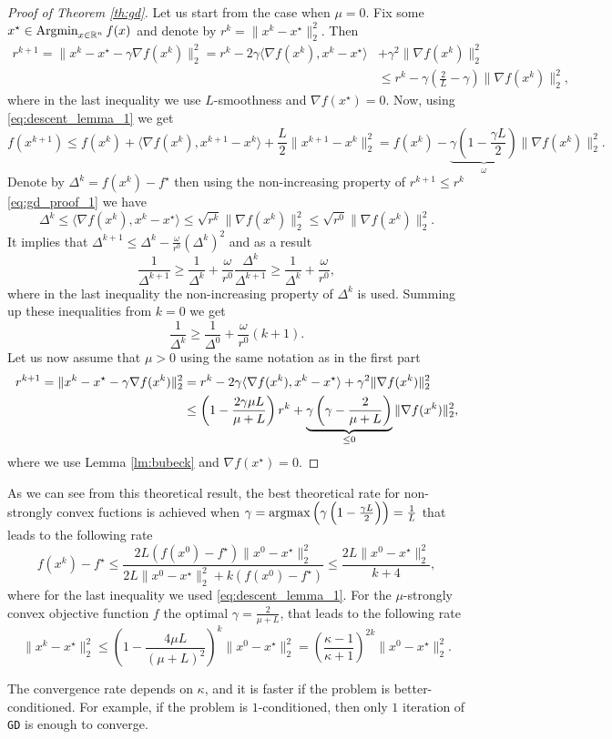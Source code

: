 \begin{proof}[Proof of Theorem \ref{th:gd}]
Let us start from the case when $\mu = 0$. Fix some $x^\star\in\operatorname*{Argmin}_{x\in\mathbb{R}^n} f(x)$ and denote by $r^k = \|x^k-x^\star\|^2_2$.
Then 
\begin{align}\label{eq:gd_proof_1}
r^{k+1} = \|x^k - x^\star - \gamma\nabla f(x^k)\|_2^2 = r^k - 2\gamma\langle \nabla f(x^k), x^k - x^\star\rangle &+ \gamma^2\|\nabla f(x^k)\|_2^2\nonumber\\
&\leq r^k - \gamma\left(\frac2L - \gamma\right)\|\nabla f(x^k)\|_2^2,
\end{align}
where in the last inequality we use $L$-smoothness and $\nabla f(x^\star) = 0$. Now, using \eqref{eq:descent_lemma_1} we get
$$
f(x^{k+1})\leq f(x^k) + \langle \nabla f(x^k), x^{k+1} - x^k\rangle + \frac{L}{2}\|x^{k+1}- x^k\|_2^2 = f(x^k) - \underbrace{\gamma\left(1 - \frac{\gamma L}{2}\right)}_{\omega}\|\nabla f(x^k)\|_2^2.
$$
Denote by $\Delta^k = f(x^k)-f^\star$ then using the non-increasing property of $r^{k+1}\leq r^k$ \eqref{eq:gd_proof_1} we have
$$
\Delta^k \leq\langle\nabla f(x^k), x^k-x^\star\rangle\leq \sqrt{r^k}\|\nabla f(x^k)\|_2^2\leq \sqrt{r^0}\|\nabla f(x^k)\|_2^2.
$$
It implies that $\Delta^{k+1}\leq\Delta^k - \frac{\omega}{r^0}(\Delta^k)^2$ and as a result
$$
\frac{1}{\Delta^{k+1}}\geq \frac{1}{\Delta^k} + \frac{\omega}{r^0}\frac{\Delta^k}{\Delta^{k+1}}\geq \frac{1}{\Delta^k} + \frac{\omega}{r^0},
$$
where in the last inequality the non-increasing property of $\Delta^k$ is used.
Summing up these inequalities from $k=0$ we get
$$
\frac{1}{\Delta^k}\geq \frac{1}{\Delta^0} + \frac{\omega}{r^0}(k+1).
$$
Let us now assume that $\mu> 0$ using the same notation as in the first part
\begin{align}
r^{k+1} = \|x^k - x^\star - \gamma \nabla f(x^k)\|_2^2 &= r^k - 2\gamma\langle \nabla f(x^k), x^k - x^\star\rangle + \gamma^2\|\nabla f(x^k)\|_2^2\nonumber\\
&\leq \left(1-\frac{2\gamma\mu L}{\mu + L}\right) {r^k}+ \underbrace{\gamma\left(\gamma - \frac{2}{\mu + L}\right)}_{\leq 0}\|\nabla f(x^k)\|_2^2,
\end{align}
where we use Lemma \ref{lm:bubeck} and $\nabla f(x^\star) = 0$.
\end{proof}
As we can see from this theoretical result, the best theoretical rate for non-strongly convex fuctions is achieved when $\gamma = \operatorname*{argmax}\left(\gamma\left(1 - \frac{\gamma L}{2}\right)\right) = \frac{1}{L}$ that leads to the following rate
\begin{equation}\label{eq:gd_rate}
    f(x^k) - f^\star \leq \frac{2L(f(x^0)-f^\star)\|x^0-x^\star\|_2^2}{2L\|x^0-x^\star\|_2^2 +k(f(x^0) - f^\star)}\leq \frac{2L\|x^0-x^\star\|^2_2}{k+4},
\end{equation}
where for the last inequality we used \eqref{eq:descent_lemma_1}.
For the $\mu$-strongly convex objective function $f$ the optimal $\gamma= \frac{2}{\mu + L}$, that leads to the following rate
\begin{equation}\label{eq:gd_rate_strongly}
\|x^k-x^\star\|_2^2\leq\left(1-\frac{4\mu L}{(\mu + L)^2}\right)^k\|x^0-x^\star\|_2^2 = \left(\frac{\kappa - 1}{\kappa + 1}\right)^{2k}\|x^0-x^\star\|_2^2.
\end{equation}

{The convergence rate depends on $\kappa$, and it is faster if the problem is better-conditioned. For example, if the problem is $1$-conditioned, then only $1$ iteration of \texttt{GD} is enough to converge.}